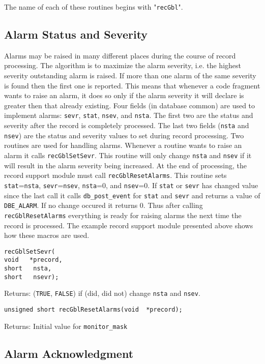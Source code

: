 The name of each of these routines begins with "\verb|recGbl|".

\subsection{Alarm Status and Severity}

Alarms may be raised in many different places during the course of record processing. The algorithm is to maximize the 
alarm severity, i.e. the highest severity outstanding alarm is raised. If more than one alarm of the same severity is found 
then the first one is reported. This means that whenever a code fragment wants to raise an alarm, it does so only if the 
alarm severity it will declare is greater then that already existing. Four fields (in database common) are used to implement 
alarms: \verb|sevr|, \verb|stat|, \verb|nsev|, and \verb|nsta|. The first two are the status and severity after the record is completely processed. 
The last two fields (\verb|nsta| and \verb|nsev|) are the status and severity values to set during record processing. Two routines are 
used for handling alarms. Whenever a routine wants to raise an alarm it calls \verb|recGblSetSevr|. This routine will only 
change \verb|nsta| and \verb|nsev| if it will result in the alarm severity being increased. At the end of processing, the record support 
module must call \verb|recGblResetAlarms|. This routine sets \verb|stat|=\verb|nsta|, \verb|sevr|=\verb|nsev|, \verb|nsta|=0, and \verb|nsev|=0. If \verb|stat| 
or \verb|sevr| has changed value since the last call it calls \verb|db_post_event| for \verb|stat| and \verb|sevr| and returns a value of 
\verb|DBE_ALARM|. If no change occured it returns 0. Thus after calling \verb|recGblResetAlarms| everything is ready for raising 
alarms the next time the record is processed. The example record support module presented above shows how these 
macros are used.

\begin{verbatim}recGblSetSevr(
void   *precord,
short   nsta,
short   nsevr);
\end{verbatim}Returns: (\verb|TRUE|, \verb|FALSE|) if (did, did not) change \verb|nsta| and \verb|nsev|.

\begin{verbatim}unsigned short recGblResetAlarms(void  *precord);
\end{verbatim}Returns: Initial value for \verb|monitor_mask|

\subsection{Alarm Acknowledgment}

